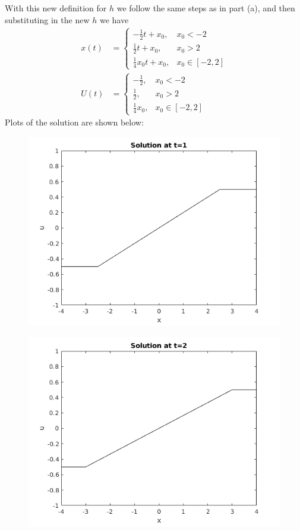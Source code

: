 \documentclass{article}
\begin{document}
With this new definition for $h$ we follow the same steps as in part
(a), and then substituting in the new $h$ we have
%
\begin{align*}
    x(t) &=
        \begin{cases}
            -\frac{1}{2} t + x_0, & x_0 < -2 \\
            \frac{1}{2} t + x_0, & x_0 > 2 \\
            \frac{1}{4} x_0 t + x_0, & x_0 \in [-2, 2]
        \end{cases}
    \\
    U(t) &=
        \begin{cases}
            -\frac{1}{2}, & x_0 < -2 \\
            \frac{1}{2}, & x_0 > 2 \\
            \frac{1}{4} x_0, & x_0 \in [-2, 2]
        \end{cases}
\end{align*}
%
Plots of the solution are shown below:
%
\begin{figure}[H]
    \centering
    \includegraphics[width=12cm]{q2pb-1}
\end{figure}
%
\begin{figure}[H]
    \centering
    \includegraphics[width=12cm]{q2pb-2}
\end{figure}
\end{document}
